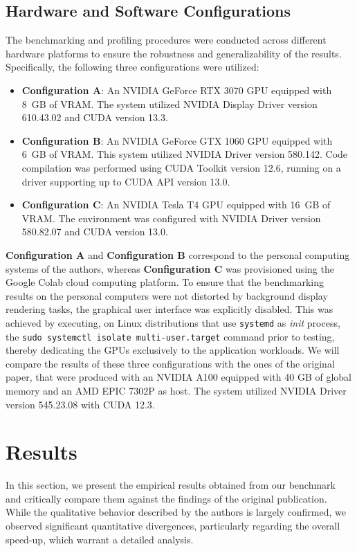 \documentclass[10pt,twocolumn]{article}
\begin{document}
\subsection{Hardware and Software Configurations}
The benchmarking and profiling procedures were conducted across different hardware platforms to ensure the robustness and generalizability of the results. Specifically, the following three configurations were utilized:
\begin{itemize}
    \item \textbf{Configuration A}: An NVIDIA GeForce RTX 3070 GPU equipped with 8~GB of VRAM. The system utilized NVIDIA Display Driver version 610.43.02 and CUDA version 13.3.
    \item \textbf{Configuration B}: An NVIDIA GeForce GTX 1060 GPU equipped with 6~GB of VRAM. This system utilized NVIDIA Driver version 580.142. Code compilation was performed using CUDA Toolkit version 12.6, running on a driver supporting up to CUDA API version 13.0.
    \item \textbf{Configuration C}: An NVIDIA Tesla T4 GPU equipped with 16~GB of VRAM. The environment was configured with NVIDIA Driver version 580.82.07 and CUDA version 13.0.
\end{itemize}
\textbf{Configuration A} and \textbf{Configuration B} correspond to the personal computing systems of the authors, whereas \textbf{Configuration C} was provisioned using the Google Colab cloud computing platform.
To ensure that the benchmarking results on the personal computers were not distorted by background display rendering tasks, the graphical user interface was explicitly disabled. This was achieved by executing, on Linux distributions that use \texttt{systemd} as \emph{init} process, the \texttt{sudo systemctl isolate multi-user.target} command prior to testing, thereby dedicating the GPUs exclusively to the application workloads.
We will compare the results of these three configurations with the ones of the original paper, that were produced with an NVIDIA A100 equipped with 40 GB of global memory and an AMD EPIC 7302P as host. The system utilized NVIDIA Driver version 545.23.08 with CUDA 12.3.

\section{Results}
In this section, we present the empirical results obtained from our benchmark and critically compare them against the findings of the original publication. While the qualitative behavior described by the authors is largely confirmed, we observed significant quantitative divergences, particularly regarding the overall speed-up, which warrant a detailed analysis.
\end{document}
